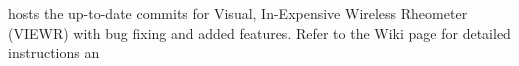  hosts the up-to-date commits for Visual, In-Expensive Wireless Rheometer (VIEWR) with bug fixing and added features. Refer to the Wiki page for detailed instructions an
